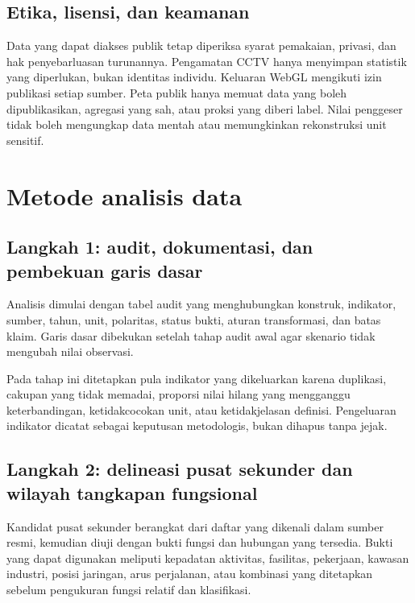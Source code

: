 \documentclass[11pt,a4paper,oneside,openany,indonesian]{report}
\begin{document}
\subsection{Etika, lisensi, dan
keamanan}\label{etika-lisensi-dan-keamanan}

Data yang dapat diakses publik tetap diperiksa syarat pemakaian,
privasi, dan hak penyebarluasan turunannya. Pengamatan CCTV hanya
menyimpan statistik yang diperlukan, bukan identitas individu. Keluaran
WebGL mengikuti izin publikasi setiap sumber. Peta publik hanya memuat
data yang boleh dipublikasikan, agregasi yang sah, atau proksi yang
diberi label. Nilai penggeser tidak boleh mengungkap data mentah atau
memungkinkan rekonstruksi unit sensitif.

\section{Metode analisis data}\label{metode-analisis-data}

\subsection{Langkah 1: audit, dokumentasi, dan pembekuan garis
dasar}\label{langkah-1-audit-dokumentasi-dan-pembekuan-garis-dasar}

Analisis dimulai dengan tabel audit yang menghubungkan konstruk,
indikator, sumber, tahun, unit, polaritas, status bukti, aturan
transformasi, dan batas klaim. Garis dasar dibekukan setelah tahap audit
awal agar skenario tidak mengubah nilai observasi.

Pada tahap ini ditetapkan pula indikator yang dikeluarkan karena
duplikasi, cakupan yang tidak memadai, proporsi nilai hilang yang
mengganggu keterbandingan, ketidakcocokan unit, atau ketidakjelasan
definisi. Pengeluaran indikator dicatat sebagai keputusan metodologis,
bukan dihapus tanpa jejak.

\subsection{Langkah 2: delineasi pusat sekunder dan wilayah
tangkapan
fungsional}\label{langkah-2-delineasi-pusat-sekunder-dan-wilayah-tangkapan-fungsional}

Kandidat pusat sekunder berangkat dari daftar yang dikenali dalam sumber
resmi, kemudian diuji dengan bukti fungsi dan hubungan yang tersedia.
Bukti yang dapat digunakan meliputi kepadatan aktivitas, fasilitas,
pekerjaan, kawasan industri, posisi jaringan, arus perjalanan, atau
kombinasi yang ditetapkan sebelum pengukuran fungsi relatif dan
klasifikasi.
\end{document}
